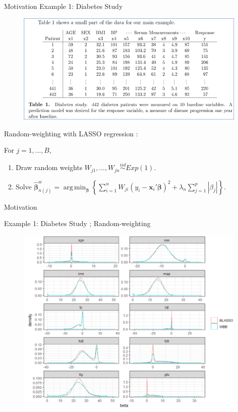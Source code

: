 \documentclass{beamer}
\DeclareMathOperator*{\argmin}{arg\,min}
\newcommand{\be}{\bm{\beta}} %
\newcommand{\sumin}{\sum_{i=1}^n} %
\newcommand{\x}{\bm{x}_i} %
\begin{document}
\begin{frame}{Motivation}
	Example 1: Diabetes Study \citep{BayesianLasso}
	\begin{figure}[h]
		\includegraphics[scale=0.35]{Fig1}
	\end{figure}
	Random-weighting with LASSO regression \citep{WBB}: \\
	\vspace{0.3cm}
	\begin{small}
		For $j = 1, \ldots, B$,
		\begin{enumerate}
			\item Draw random weights $W_{j1},  \ldots, W_{jn} \stackrel{iid}{\sim} Exp(1)$.
			\item Solve $\widehat{\be}_{n(j)}^w = \argmin_{\be} \left\{ \sumin W_{ji} ( y_i - \x' \be )^2 + \lambda_n \sum_{j=1}^p |\beta_j| \right\}$.
		\end{enumerate}
	\end{small}
\end{frame}

\begin{frame}{Motivation}
	\begin{tiny}
		Example 1: Diabetes Study \citep{BayesianLasso}; Random-weighting \citep{WBB} 
	\end{tiny}
	\begin{figure}[h]
		\includegraphics[scale=0.47]{Fig3}
	\end{figure}
\end{frame}
\end{document}
